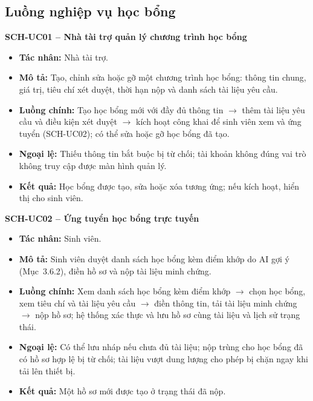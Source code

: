 \subsection{Luồng nghiệp vụ học bổng}

\noindent\textbf{SCH-UC01 -- Nhà tài trợ quản lý chương trình học bổng}
\begin{itemize}
    \item \textbf{Tác nhân:} Nhà tài trợ.
    \item \textbf{Mô tả:} Tạo, chỉnh sửa hoặc gỡ một chương trình học bổng: thông tin chung, giá trị, tiêu chí xét duyệt, thời hạn nộp và danh sách tài liệu yêu cầu.
    \item \textbf{Luồng chính:} Tạo học bổng mới với đầy đủ thông tin $\rightarrow$ thêm tài liệu yêu cầu và điều kiện xét duyệt $\rightarrow$ kích hoạt công khai để sinh viên xem và ứng tuyển (SCH-UC02); có thể sửa hoặc gỡ học bổng đã tạo.
    \item \textbf{Ngoại lệ:} Thiếu thông tin bắt buộc bị từ chối; tài khoản không đúng vai trò không truy cập được màn hình quản lý.
    \item \textbf{Kết quả:} Học bổng được tạo, sửa hoặc xóa tương ứng; nếu kích hoạt, hiển thị cho sinh viên.
\end{itemize}

\noindent\textbf{SCH-UC02 -- Ứng tuyển học bổng trực tuyến}
\begin{itemize}
    \item \textbf{Tác nhân:} Sinh viên.
    \item \textbf{Mô tả:} Sinh viên duyệt danh sách học bổng kèm điểm khớp do AI gợi ý (Mục~3.6.2), điền hồ sơ và nộp tài liệu minh chứng.
    \item \textbf{Luồng chính:} Xem danh sách học bổng kèm điểm khớp $\rightarrow$ chọn học bổng, xem tiêu chí và tài liệu yêu cầu $\rightarrow$ điền thông tin, tải tài liệu minh chứng $\rightarrow$ nộp hồ sơ; hệ thống xác thực và lưu hồ sơ cùng tài liệu và lịch sử trạng thái.
    \item \textbf{Ngoại lệ:} Có thể lưu nháp nếu chưa đủ tài liệu; nộp trùng cho học bổng đã có hồ sơ hợp lệ bị từ chối; tài liệu vượt dung lượng cho phép bị chặn ngay khi tải lên thiết bị.
    \item \textbf{Kết quả:} Một hồ sơ mới được tạo ở trạng thái đã nộp.
\end{itemize}

